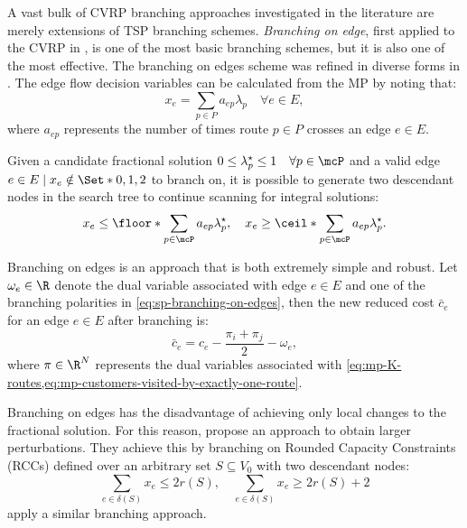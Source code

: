 A vast bulk of CVRP branching approaches investigated in the literature are
merely extensions of TSP branching schemes.
\textit{Branching on edge},
first applied to the CVRP in \textcite{christofides1969},
is one of the most basic branching schemes, but it is also one of the most effective.
The branching on edges scheme was refined in diverse forms in \textcite{fisher1994, miller1995}.
The edge flow decision variables can be calculated from the MP by noting that:
\begin{equation}
	x_e = \sum_{p \in P} a_{ep} \lambda_p  \quad \forall e \in E,
\end{equation}
where $a_{ep}$ represents the number of times route $p \in P$ crosses an edge $e \in E$.

Given a candidate fractional solution $0 \le \lambda^\star_p \le 1 \quad \forall p \in \mcP$
and a valid edge $e \in E \mid x_e \notin \Set*{0, 1, 2}$ to branch on,
it is possible to generate two descendant nodes in the search tree
to continue scanning for integral solutions:
\begin{equation}\label{eq:sp-branching-on-edges}
	x_e \le \floor*{\sum_{p \in \mcP} a_{ep} \lambda^\star_p}, \quad
	x_e \ge \ceil*{\sum_{p \in \mcP} a_{ep} \lambda^\star_p}.
\end{equation}

Branching on edges is an approach that is both extremely simple and robust.
Let $\omega_e \in \R$ denote the dual variable associated with edge $e \in E$
and one of the branching polarities in \cref{eq:sp-branching-on-edges},
then the new reduced cost $\bar{c}_e$ for an edge $e \in E$ after branching is:
\begin{equation}
	\bar{c}_e = c_e - \frac{\pi_i + \pi_j}{2} - \omega_e,
\end{equation}
where $\pi \in \R^N$ represents the dual variables associated with
\cref{eq:mp-K-routes,eq:mp-customers-visited-by-exactly-one-route}.

Branching on edges has the disadvantage of achieving only local changes
to the fractional solution.
For this reason, \textcite{augerat1998} propose an
approach to obtain larger perturbations.
They achieve this by branching on Rounded Capacity Constraints (RCCs) defined over
an arbitrary set $S \subseteq V_0$ with two descendant nodes:
\begin{equation}\label{eq:sp-branching-on-cutsets}
	\sum_{e \in \delta(S)}x_e \le 2 r(S), \quad
	\sum_{e \in \delta(S)}x_e \ge 2 r(S) + 2
\end{equation}
\textcite{pecin2017improved} apply a similar branching approach.

